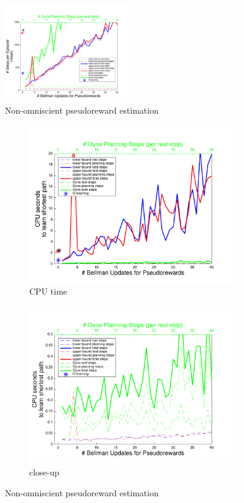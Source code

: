 \documentclass[letterpaper]{article}
\begin{document}
\begin{figure}[ht]
\centering
\includegraphics[width=0.5\textwidth]{learning_vs_PRiterationsLearnMod_DYNA_mean}
\caption{Non-omniscient pseudoreward estimation}
\label{fig:S2a}
\end{figure}

\begin{figure}
\centering
\begin{subfigure}{.4\textwidth}
  \centering
  \includegraphics[width=.95\linewidth]{cpus_vs_PRiterationsLearnMod_DYNA_toGoal}
  \caption{CPU time}
\end{subfigure}
\begin{subfigure}{.4\textwidth}
  \centering
  \includegraphics[width=.95\linewidth]{cpus_vs_PRiterationsLearnMod_DYNA_toGoal_closeup}
  \caption{close-up}
\end{subfigure}
\caption{Non-omniscient pseudoreward estimation}
\label{fig:S2b}
\end{figure}
\end{document}
